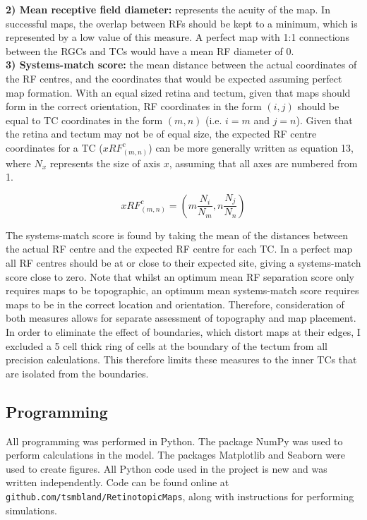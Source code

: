 \documentclass[11pt]{"article"}
\begin{document}
\textbf{2) Mean receptive field diameter:} represents the acuity of the map. In successful maps, the overlap between RFs should be kept to a minimum, which is represented by a low value of this measure. A perfect map with 1:1 connections between the RGCs and TCs would have a mean RF diameter of 0.
\\

\textbf{3) Systems-match score:} the mean distance between the actual coordinates of the RF centres, and the coordinates that would be expected assuming perfect map formation. With an equal sized retina and tectum, given that maps should form in the correct orientation, RF coordinates in the form $(i,j)$ should be equal to TC coordinates in the form $(m,n)$ (i.e. $i = m$ and $j = n$). Given that the retina and tectum may not be of equal size, the expected RF centre coordinates for a TC ($xRF^c_{(m,n)}$) can be more generally written as equation 13, where $N_x$ represents the size of axis $x$, assuming that all axes are numbered from 1.

\begin{equation}
xRF^c_{(m,n)} = \left( m \frac{N_i}{N_m} , n \frac{N_j}{N_n} \right)
\end{equation}

The systems-match score is found by taking the mean of the distances between the actual RF centre and the expected RF centre for each TC. In a perfect map all RF centres should be at or close to their expected site, giving a systems-match score close to zero. Note that whilst an optimum mean RF separation score only requires maps to be topographic, an optimum mean systems-match score requires maps to be in the correct location and orientation. Therefore, consideration of both measures allows for separate assessment of topography and map placement.\\

In order to eliminate the effect of boundaries, which distort maps at their edges, I excluded a 5 cell thick ring of cells at the boundary of the tectum from all precision calculations. This therefore limits these measures to the inner TCs that are isolated from the boundaries.\\


\subsection{Programming}
All programming was performed in Python. The package NumPy was used to perform  calculations in the model. The packages Matplotlib and Seaborn were used to create figures. All Python code used in the project is new and was written independently. Code can be found online at \texttt{github.com/tsmbland/RetinotopicMaps}, along with instructions for performing simulations.\\
\end{document}
